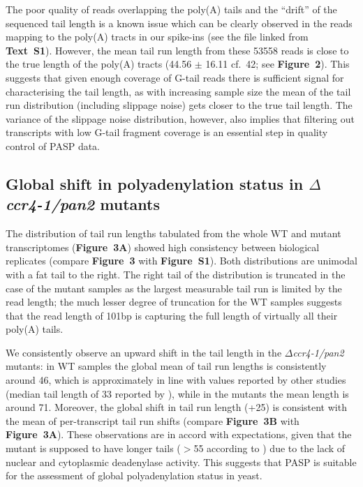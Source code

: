 \documentclass[10pt]{article}
\begin{document}
The poor quality of reads overlapping the poly(A) tails and the ``drift'' of the sequenced tail length is a known issue \cite{wilkening13} which can be clearly observed in the reads mapping to the poly(A) tracts in our spike-ins (see the file linked from \textbf{Text~S1}). 
However, the mean tail run length from these 53558 reads is close to the true length of the poly(A) tracts (44.56 $\pm$ 16.11 cf.\ 42; see \textbf{Figure~2}). This suggests that given enough coverage of G-tail reads there is sufficient signal for characterising the tail length, as with increasing sample size the mean of the tail run distribution (including slippage noise) gets closer to the true tail length. The variance of the slippage noise distribution, however, also implies that filtering out transcripts with low G-tail fragment coverage is an essential step in quality control of PASP data.

\subsection*{Global shift in polyadenylation status in \textit{$\Delta$ccr4-1/pan2} mutants}

The distribution of tail run lengths tabulated from the whole WT and mutant transcriptomes (\textbf{Figure~3A}) showed high consistency between biological replicates (compare \textbf{Figure~3} with \textbf{Figure~S1}). Both distributions are unimodal with a fat tail to the right. The right tail of the distribution is truncated in the case of the mutant samples as the largest measurable tail run is limited by the read length; the much lesser degree of truncation for the WT samples suggests that the read length of 101bp is capturing the full length of virtually all their poly(A) tails.

We consistently observe an upward shift in the tail length in the \textit{$\Delta$ccr4-1/pan2} mutants: in WT samples the global mean of tail run lengths is consistently around 46, which is approximately in line with values reported by other studies (median tail length of 33 reported by \cite{subtelny14}), while in the mutants the mean length is around 71. Moreover, the global shift in tail run length (+25) is consistent with the mean of per-transcript tail run shifts (compare \textbf{Figure~3B} with \textbf{Figure~3A}). These observations are in accord with expectations, given that the mutant is supposed to have longer tails ($>$55 according to \cite{beilharz07}) due to the lack of nuclear and cytoplasmic deadenylase activity. This suggests that PASP is suitable for the assessment of global polyadenylation status in yeast.
\end{document}

